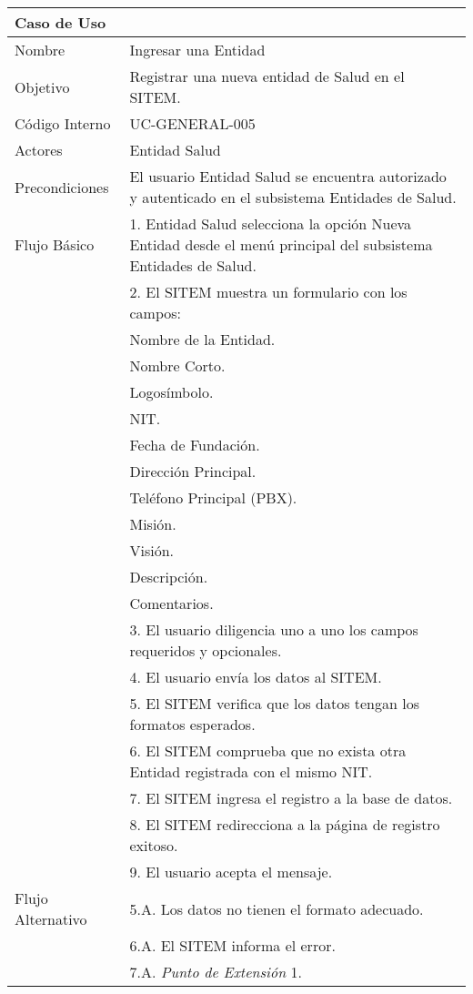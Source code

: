 \begin{table}
\begin{center}
\begin{tabular}{|l|p{10cm}|}
\hline
\textbf{Caso de Uso}&\\
\hline
Nombre & Ingresar una Entidad\\
\hline
Objetivo & Registrar una nueva entidad de Salud en el SITEM.\\
\hline
Código Interno & UC-GENERAL-005 \\
\hline
Actores & Entidad Salud\\
\hline
Precondiciones & El usuario Entidad Salud se encuentra autorizado y autenticado en el subsistema Entidades de Salud.\\
\hline
Flujo Básico & 1. Entidad Salud selecciona la opción Nueva Entidad desde el menú principal del subsistema Entidades de Salud.\\
& 2. El SITEM muestra un formulario con los campos:\\
& Nombre de la Entidad.\\
&Nombre Corto.\\
&Logosímbolo.\\
&NIT.\\
&Fecha de Fundación.\\
&Dirección Principal.\\
&Teléfono Principal (PBX).\\
&Misión.\\
&Visión.\\
&Descripción.\\
&Comentarios.\\
& 3. El usuario diligencia uno a uno los campos requeridos y opcionales.\\
& 4. El usuario envía los datos al SITEM.\\
& 5. El SITEM verifica que los datos tengan los formatos esperados.\\
& 6. El SITEM comprueba que no exista otra Entidad registrada con el mismo NIT.\\
& 7. El SITEM ingresa el registro a la base de datos.\\
& 8. El SITEM redirecciona a la página de registro exitoso.\\
& 9. El usuario acepta el mensaje.\\
\hline
Flujo Alternativo & 5.A. Los datos no tienen el formato adecuado. \\
& 6.A. El SITEM informa el error.\\
& 7.A. \textit{Punto de Extensión} 1.\\

\end{tabular}
\end{center}
\end{table}
